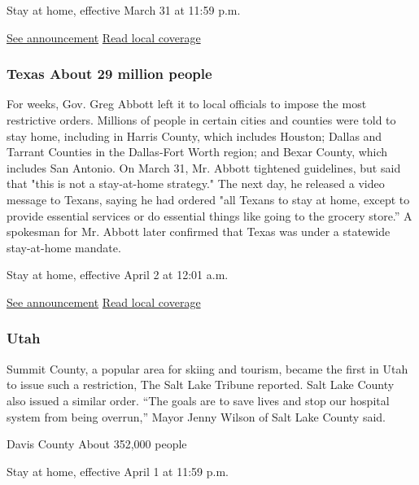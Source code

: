 Stay at home, effective March 31 at 11:59 p.m.

\href{https://publications.tnsosfiles.com/pub/execorders/exec-orders-lee22.pdf}{See
announcement} \textbar{}
\href{https://www.tennessean.com/story/news/health/2020/03/30/tennessee-governor-bill-lee-stay-at-home-order-to-stop-coronavirus/2937429001/}{Read
local coverage}

\hypertarget{texas-about-29-million-people}{%
\subsubsection{Texas About 29 million
people}\label{texas-about-29-million-people}}

For weeks, Gov. Greg Abbott left it to local officials to impose the
most restrictive orders. Millions of people in certain cities and
counties were told to stay home, including in Harris County, which
includes Houston; Dallas and Tarrant Counties in the Dallas-Fort Worth
region; and Bexar County, which includes San Antonio. On March 31, Mr.
Abbott tightened guidelines, but said that "this is not a stay-at-home
strategy." The next day, he released a video message to Texans, saying
he had ordered "all Texans to stay at home, except to provide essential
services or do essential things like going to the grocery store.'' A
spokesman for Mr. Abbott later confirmed that Texas was under a
statewide stay-at-home mandate.

Stay at home, effective April 2 at 12:01 a.m.

\href{https://gov.texas.gov/uploads/files/press/EO-GA-14_Statewide_Essential_Service_and_Activity_COVID-19_IMAGE_03-31-2020.pdf}{See
announcement} \textbar{}
\href{https://www.texastribune.org/2020/03/31/greg-abbott-texas-executive-order-closures/}{Read
local coverage}

\hypertarget{utah}{%
\subsubsection{Utah}\label{utah}}

Summit County, a popular area for skiing and tourism, became the first
in Utah to issue such a restriction, The Salt Lake Tribune reported.
Salt Lake County also issued a similar order. ``The goals are to save
lives and stop our hospital system from being overrun,'' Mayor Jenny
Wilson of Salt Lake County said.

Davis County About 352,000 people

Stay at home, effective April 1 at 11:59 p.m.

